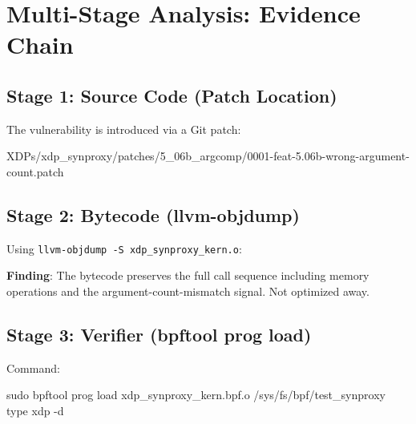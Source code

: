 \section{Multi-Stage Analysis: Evidence Chain}

\subsection{Stage 1: Source Code (Patch Location)}

The vulnerability is introduced via a Git patch: 
\begin{tcolorbox}[colback=gray!10, colframe=gray!10, arc=2pt, boxrule=0pt]
\small\ttfamily
XDPs/xdp\_synproxy/patches/5\_06b\_argcomp/0001-feat-5.06b-wrong-argument-count.patch
\end{tcolorbox}

\subsection{Stage 2: Bytecode (llvm-objdump)}

Using \texttt{llvm-objdump -S xdp\_synproxy\_kern.o}:

\vspace{0.3cm}
\noindent
{}
\vspace{0.3cm}

\noindent
\textbf{Finding}: The bytecode preserves the full call sequence including memory operations and the argument-count-mismatch signal. Not optimized away.

\subsection{Stage 3: Verifier (bpftool prog load)}

Command:
\begin{tcolorbox}[colback=gray!10, colframe=gray!10, arc=2pt, boxrule=0pt]
\small\ttfamily
sudo bpftool prog load xdp\_synproxy\_kern.bpf.o /sys/fs/bpf/test\_synproxy type xdp -d
\end{tcolorbox}

